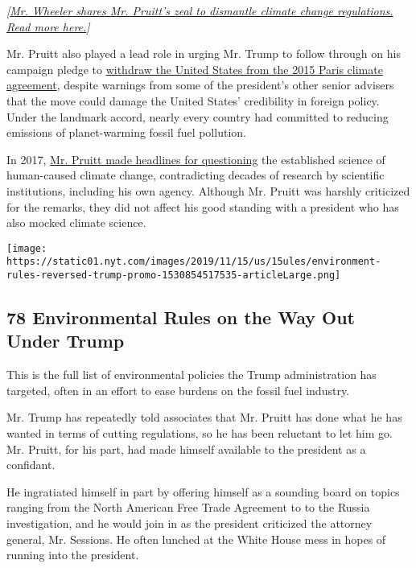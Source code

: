 \emph{{[}}\href{https://www.nytimes.com/2018/07/05/climate/wheeler-epa-pruitt.html}{\emph{Mr.
Wheeler shares Mr. Pruitt's zeal to dismantle climate change
regulations. Read more here.}}\emph{{]}}

Mr. Pruitt also played a lead role in urging Mr. Trump to follow through
on his campaign pledge to
\href{https://www.nytimes.com/2017/06/01/climate/trump-paris-climate-agreement.html}{withdraw
the United States from the 2015 Paris climate agreement}, despite
warnings from some of the president's other senior advisers that the
move could damage the United States' credibility in foreign policy.
Under the landmark accord, nearly every country had committed to
reducing emissions of planet-warming fossil fuel pollution.

In 2017,
\href{https://www.nytimes.com/2017/03/09/us/politics/epa-scott-pruitt-global-warming.html}{Mr.
Pruitt made headlines for questioning} the established science of
human-caused climate change, contradicting decades of research by
scientific institutions, including his own agency. Although Mr. Pruitt
was harshly criticized for the remarks, they did not affect his good
standing with a president who has also mocked climate science.

\href{https://www.nytimes.com/interactive/2017/10/05/climate/trump-environment-rules-reversed.html}{}

\texttt{[image: https://static01.nyt.com/images/2019/11/15/us/15ules/environment-rules-reversed-trump-promo-1530854517535-articleLarge.png]}

\hypertarget{78-environmental-rules-on-the-way-out-under-trump}{%
\subsection{78 Environmental Rules on the Way Out Under
Trump}\label{78-environmental-rules-on-the-way-out-under-trump}}

This is the full list of environmental policies the Trump administration
has targeted, often in an effort to ease burdens on the fossil fuel
industry.

Mr. Trump has repeatedly told associates that Mr. Pruitt has done what
he has wanted in terms of cutting regulations, so he has been reluctant
to let him go. Mr. Pruitt, for his part, had made himself available to
the president as a confidant.

He ingratiated himself in part by offering himself as a sounding board
on topics ranging from the North American Free Trade Agreement to to the
Russia investigation, and he would join in as the president criticized
the attorney general, Mr. Sessions. He often lunched at the White House
mess in hopes of running into the president.


